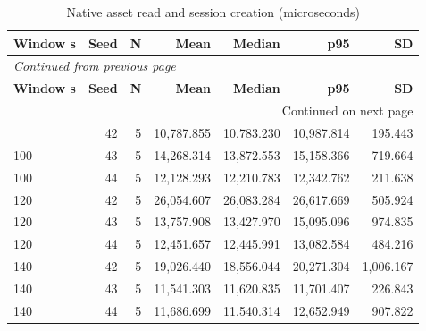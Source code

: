 \documentclass[10pt,a4paper]{article}
\begin{document}
\begin{longtable}{@{}lrrrrrr@{}}
\caption{Native asset read and session creation (microseconds)}\\
\toprule
\textbf{Window s} & \textbf{Seed} & \textbf{N} & \textbf{Mean} & \textbf{Median} & \textbf{p95} & \textbf{SD} \\
\midrule\endfirsthead
\multicolumn{7}{l}{\small\itshape Continued from previous page}\\
\toprule
\textbf{Window s} & \textbf{Seed} & \textbf{N} & \textbf{Mean} & \textbf{Median} & \textbf{p95} & \textbf{SD} \\
\midrule\endhead
\midrule\multicolumn{7}{r}{\small Continued on next page}\\\endfoot
\bottomrule\endlastfoot
100 & 42 & 5 & 10,787.855 & 10,783.230 & 10,987.814 & 195.443 \\
100 & 43 & 5 & 14,268.314 & 13,872.553 & 15,158.366 & 719.664 \\
100 & 44 & 5 & 12,128.293 & 12,210.783 & 12,342.762 & 211.638 \\
120 & 42 & 5 & 26,054.607 & 26,083.284 & 26,617.669 & 505.924 \\
120 & 43 & 5 & 13,757.908 & 13,427.970 & 15,095.096 & 974.835 \\
120 & 44 & 5 & 12,451.657 & 12,445.991 & 13,082.584 & 484.216 \\
140 & 42 & 5 & 19,026.440 & 18,556.044 & 20,271.304 & 1,006.167 \\
140 & 43 & 5 & 11,541.303 & 11,620.835 & 11,701.407 & 226.843 \\
140 & 44 & 5 & 11,686.699 & 11,540.314 & 12,652.949 & 907.822 \\
\end{longtable}\endgroup
\begingroup\small\setlength{\tabcolsep}{4pt}\renewcommand{\arraystretch}{1.12}
\end{document}
